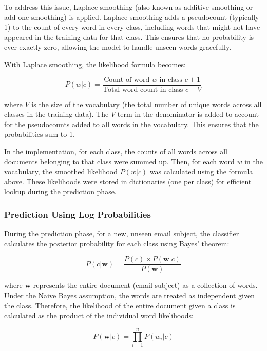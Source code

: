 \documentclass[12pt,letterpaper]{article}
\begin{document}
To address this issue, Laplace smoothing (also known as additive smoothing or add-one smoothing) is applied. Laplace smoothing adds a pseudocount (typically 1) to the count of every word in every class, including words that might not have appeared in the training data for that class. This ensures that no probability is ever exactly zero, allowing the model to handle unseen words gracefully.

With Laplace smoothing, the likelihood formula becomes:

\begin{equation}
P(w | c) = \frac{\text{Count of word } w \text{ in class } c + 1}{\text{Total word count in class } c + V}
\end{equation}

where $V$ is the size of the vocabulary (the total number of unique words across all classes in the training data). The $V$ term in the denominator is added to account for the pseudocounts added to all words in the vocabulary. This ensures that the probabilities sum to 1.

In the implementation, for each class, the counts of all words across all documents belonging to that class were summed up. Then, for each word $w$ in the vocabulary, the smoothed likelihood $P(w | c)$ was calculated using the formula above. These likelihoods were stored in dictionaries (one per class) for efficient lookup during the prediction phase.

\subsubsection{Prediction Using Log Probabilities}

During the prediction phase, for a new, unseen email subject, the classifier calculates the posterior probability for each class using Bayes' theorem:

\begin{equation}
P(c | \mathbf{w}) = \frac{P(c) \times P(\mathbf{w} | c)}{P(\mathbf{w})}
\end{equation}

where $\mathbf{w}$ represents the entire document (email subject) as a collection of words. Under the Naive Bayes assumption, the words are treated as independent given the class. Therefore, the likelihood of the entire document given a class is calculated as the product of the individual word likelihoods:

\begin{equation}
P(\mathbf{w} | c) = \prod_{i=1}^{n} P(w_i | c)
\end{equation}
\end{document}

